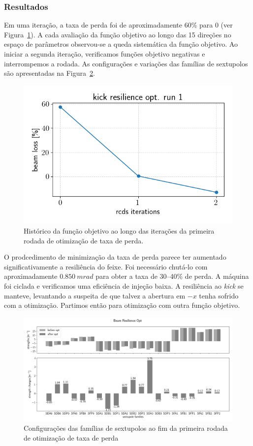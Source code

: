 \documentclass[a4paper,
               keeplastbox,   %
               ]{jacow}
\begin{document}
\subsubsection{Resultados}
Em uma iteração, a taxa de perda foi de aproximadamente 60\% para 0 (ver Figura~\ref{beam_loss_hist}). A cada avaliação da função objetivo ao longo das 15 direções no espaço de parâmetros observou-se a queda sistemática da função objetivo. Ao iniciar a segunda iteração, verificamos funções objetivo negativas e interrompemos a rodada. As configurações e variações das famílias de sextupolos são apresentadas na Figura~\ref{beam_loss_sexts}. 
\begin{figure}
    \centering
    \includegraphics[width=\columnwidth]{beam_loss_hist_run1.png}
    \caption{Histórico da função objetivo ao longo das iterações da primeira rodada de otimização de taxa de perda.}
    \label{beam_loss_hist}
\end{figure}

 O prodcedimento de minimização da taxa de perda parece ter aumentado significativamente a resiliência do feixe. Foi necessário chutá-lo com aproximadamente $0.850~\unit{m rad}$ para obter a taxa de 30--40\% de perda. A máquina foi ciclada e verificamos uma eficiência de injeção baixa. A resiliência ao \textit{kick} se manteve, levantando a suspeita de que talvez a abertura em $-x$ tenha sofrido com a otimização. Partimos então para otimização com outra função objetivo. 

\begin{figure}[t]
    \centering
    \includegraphics*[width=\textwidth]{beam_loss_sexts.png}
    \caption{Configurações das famílias de sextupolos ao fim da primeira rodada de otimização de taxa de perda}
    \label{beam_loss_sexts}
\end{figure}
\end{document}
